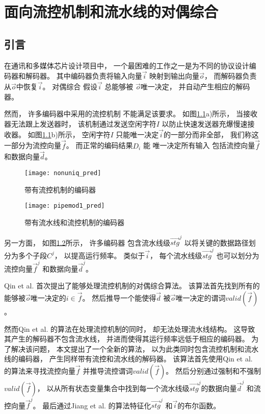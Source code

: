 \chapter{面向流控机制和流水线的对偶综合}
\label{chap:6}

\section{引言}\label{sec_intro}
在通讯和多媒体芯片设计项目中，
一个最困难的工作之一是为不同的协议设计编码器和解码器。
其中编码器负责将输入向量$\vec{i}$ 映射到输出向量$\vec{o}$，
而解码器负责从$\vec{o}$中恢复$\vec{i}$。
对偶综合
假设$\vec{i}$ 总能够被 $\vec{o}$唯一决定，
并自动产生相应的解码器。

然而，
许多编码器中采用的流控机制
不能满足该要求。
如图\ref{fig_fc}a)所示，
当接收器无法跟上发送器时，
该机制通过发送空闲字符$I$ 以防止快速发送器充爆慢速接收器。
如图\ref{fig_fc}b)所示，
空闲字符$I$
只能唯一决定$\vec{i}$的一部分而非全部，
我们称这一部分为流控向量$\vec{f}$。
而正常的编码结果$D_i$ 能
唯一决定所有输入
包括流控向量$\vec{f}$ 和数据向量$\vec{d}$。


\begin{figure}[t]
\centering
\texttt{[image: nonuniq\_pred]}
\caption{带有流控机制的编码器}
\label{fig_fc}
\end{figure}

\begin{figure}[b]
\centering
\texttt{[image: pipemod1\_pred]}
\caption{带有流水线和流控机制的编码器}
\label{fig_pipeenc}
\end{figure}



另一方面，
如图\ref{fig_pipeenc}所示，
许多编码器
包含流水线级$\vec{stg}^j$ 以将关键的数据路径划分为多个子段$C^j$，
以提高运行频率。
类似于$\vec{i}$，
每个流水线级$\vec{stg}^j$ 也可以划分为流控向量$\vec{f}^j$ 和数据向量$\vec{d}^j$。

Qin et al.  首次提出了能够处理流控机制的对偶综合算法。
该算法首先找到所有的能够被$\vec{o}$唯一决定的$i\in\vec{f}$。
然后推导一个能使得$\vec{d}$ 被$\vec{o}$唯一决定的谓词$valid(\vec{f})$。

然而Qin et al. 的算法在处理流控机制的同时，
却无法处理流水线结构。
这导致其产生的解码器不包含流水线，
并进而使得其运行频率远低于相应的编码器。
为了解决该问题，
本文提出了一个全新的算法，
以为此类同时包含流控机制和流水线的编码器，
产生同样带有流控和流水线的解码器。
该算法首先使用Qin et al. 的算法来寻找流控向量$\vec{f}$ 并推导流控谓词$valid(\vec{f})$。
然后分别通过强制和不强制$valid(\vec{f})$，
以从所有状态变量集合中找到每一个流水线级$\vec{stg}^j$的数据向量$\vec{d}^j$ 和流控向量$\vec{f}^j$。
最后通过Jiang et al. 的算法特征化$\vec{stg}^j$ 和$\vec{i}$的布尔函数。

